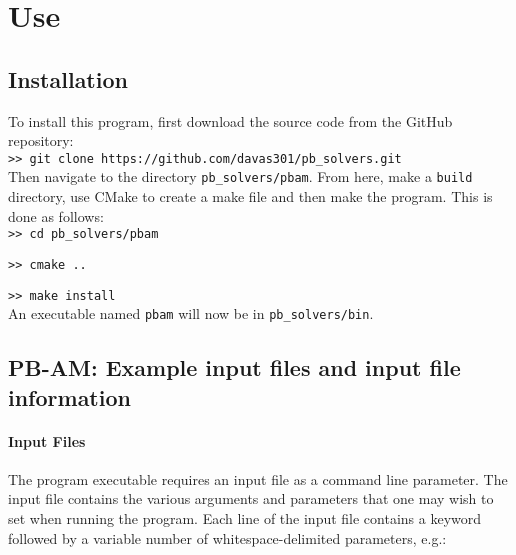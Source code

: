 \clearpage


\chapter{Use}

\section{Installation}

To install this program, first download the source code from the GitHub repository: \\

\hspace{1cm}\texttt{>> git clone https://github.com/davas301/pb\_solvers.git} \\

Then navigate to the directory \texttt{pb\_solvers/pbam}. From here, make a \texttt{build} directory, use CMake to create a make file and then make the program.  This is done as follows: \\

\hspace{1cm}\texttt{>> cd pb\_solvers/pbam} 

\hspace{1cm}\texttt{>> cmake ..} 

\hspace{1cm}\texttt{>> make install} \\


An executable named \texttt{pbam} will now be in \texttt{pb\_solvers/bin}.

\section{PB-AM: Example input files and input file information}

\subsubsection{Input Files}

The program executable requires an input file as a command line parameter. The input file contains the various arguments and parameters that one may wish to set when running the program. Each line of the input file contains a keyword followed by a variable number of whitespace-delimited parameters, e.g.: \\

